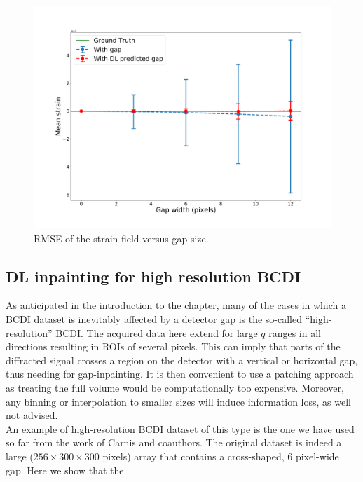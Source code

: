 \begin{figure}[ht]
    \centering
    \includegraphics[width=\textwidth]{figures/Inpainting/avg_strain_comparison-1.pdf}
    \caption{RMSE of the strain field versus gap size.}
    \label{fig:Carnis_avg}
\end{figure}

\subsection{DL inpainting for high resolution BCDI}\label{sec:highres}
As anticipated in the introduction to the chapter, many of the cases in which a BCDI dataset is inevitably affected by 
a detector gap is the so-called ``high-resolution'' BCDI. The acquired data here extend for large $q$ ranges in all
directions resulting in ROIs of several pixels. This can imply that parts of the diffracted signal crosses a region 
on the detector with a vertical or horizontal gap, thus needing for gap-inpainting. It is then convenient to use a
patching approach as treating the full volume would be computationally too expensive. Moreover, any binning or interpolation
to smaller sizes will induce information loss, as well not advised. \\
An example of high-resolution BCDI dataset of this type is the one we have used so far from the work of Carnis and coauthors. 
The original dataset is indeed a large ($256\times300\times300$ pixels) array that contains a cross-shaped, 6 pixel-wide 
gap. Here we show that the 


